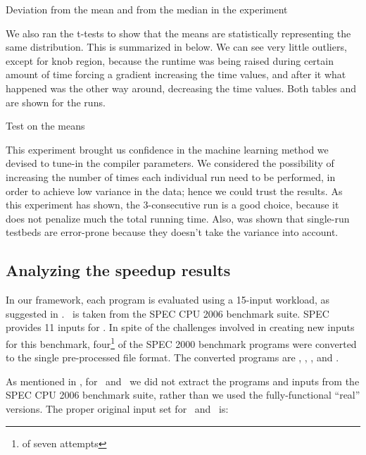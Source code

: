 \begin{table}
  \centering
  \begin{tiny}
  
  \end{tiny}
  \caption{Deviation from the mean and from the median in the experiment}
  \label{tab:simStats}
\end{table}

We also ran the t-tests to show that the means are statistically representing the same distribution. This is summarized in  below. We can see very little outliers, except for knob region, because the runtime was being raised during certain amount of time forcing a gradient increasing the time values, and after it what happened was the other way around, decreasing the time values. Both tables  and  are shown for the runs.

\begin{table}
  \centering
  \begin{tiny}
  
  \end{tiny}
  \caption{Test on the means}
  \label{tab:statTest}
\end{table}

This experiment brought us confidence in the machine learning method we devised to tune-in the compiler parameters. We considered the possibility of increasing the number of times each individual run need to be performed, in order to achieve low variance in the data; hence we could trust the results. As this experiment has shown, the $3$-consecutive run is a good choice, because it does not penalize much the total running time. Also, was shown that single-run testbeds are error-prone because they doesn't take the variance into account.

\subsection{Analyzing the speedup results}

In our framework, each program is evaluated using a 15-input workload, as suggested in \cite{BerubePhD}. \Gcc\ is taken from the SPEC CPU 2006 benchmark suite.  SPEC provides 11 inputs for \gcc. In spite of the challenges involved in creating new inputs for this benchmark, four\footnote{of seven attempts} of the SPEC 2000 benchmark programs were converted to the single pre-processed file format. The converted programs are \bzip, \lbm, \mcf, and \parser.

As mentioned in , for \bzip\ and \gzip\ we did not extract the programs and inputs from the SPEC CPU 2006 benchmark suite, rather than we used the fully-functional ``real'' versions. The proper original input set for \bzip\ and \gzip\ is:

